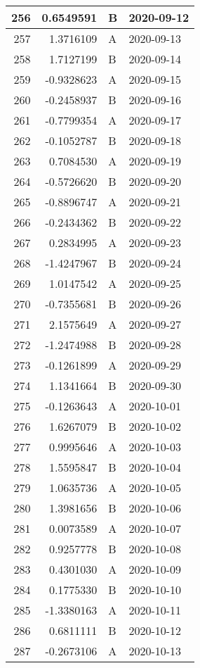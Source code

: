 \begin{tabular}{r|r|l|l}
\hline
256 & 0.6549591 & B & 2020-09-12\\
\hline
257 & 1.3716109 & A & 2020-09-13\\
\hline
258 & 1.7127199 & B & 2020-09-14\\
\hline
259 & -0.9328623 & A & 2020-09-15\\
\hline
260 & -0.2458937 & B & 2020-09-16\\
\hline
261 & -0.7799354 & A & 2020-09-17\\
\hline
262 & -0.1052787 & B & 2020-09-18\\
\hline
263 & 0.7084530 & A & 2020-09-19\\
\hline
264 & -0.5726620 & B & 2020-09-20\\
\hline
265 & -0.8896747 & A & 2020-09-21\\
\hline
266 & -0.2434362 & B & 2020-09-22\\
\hline
267 & 0.2834995 & A & 2020-09-23\\
\hline
268 & -1.4247967 & B & 2020-09-24\\
\hline
269 & 1.0147542 & A & 2020-09-25\\
\hline
270 & -0.7355681 & B & 2020-09-26\\
\hline
271 & 2.1575649 & A & 2020-09-27\\
\hline
272 & -1.2474988 & B & 2020-09-28\\
\hline
273 & -0.1261899 & A & 2020-09-29\\
\hline
274 & 1.1341664 & B & 2020-09-30\\
\hline
275 & -0.1263643 & A & 2020-10-01\\
\hline
276 & 1.6267079 & B & 2020-10-02\\
\hline
277 & 0.9995646 & A & 2020-10-03\\
\hline
278 & 1.5595847 & B & 2020-10-04\\
\hline
279 & 1.0635736 & A & 2020-10-05\\
\hline
280 & 1.3981656 & B & 2020-10-06\\
\hline
281 & 0.0073589 & A & 2020-10-07\\
\hline
282 & 0.9257778 & B & 2020-10-08\\
\hline
283 & 0.4301030 & A & 2020-10-09\\
\hline
284 & 0.1775330 & B & 2020-10-10\\
\hline
285 & -1.3380163 & A & 2020-10-11\\
\hline
286 & 0.6811111 & B & 2020-10-12\\
\hline
287 & -0.2673106 & A & 2020-10-13\\

\end{tabular}
